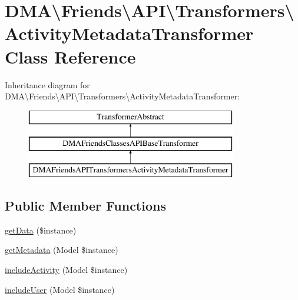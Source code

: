\hypertarget{classDMA_1_1Friends_1_1API_1_1Transformers_1_1ActivityMetadataTransformer}{}\section{D\+M\+A\textbackslash{}Friends\textbackslash{}A\+P\+I\textbackslash{}Transformers\textbackslash{}Activity\+Metadata\+Transformer Class Reference}
\label{classDMA_1_1Friends_1_1API_1_1Transformers_1_1ActivityMetadataTransformer}
Inheritance diagram for D\+M\+A\textbackslash{}Friends\textbackslash{}A\+P\+I\textbackslash{}Transformers\textbackslash{}Activity\+Metadata\+Transformer\+:\begin{figure}[H]
\begin{center}
\leavevmode
\includegraphics[height=3.000000cm]{dd/d8c/classDMA_1_1Friends_1_1API_1_1Transformers_1_1ActivityMetadataTransformer}
\end{center}
\end{figure}
\subsection*{Public Member Functions}
\begin{DoxyCompactItemize}
\item 
\hyperlink{classDMA_1_1Friends_1_1API_1_1Transformers_1_1ActivityMetadataTransformer_af1bd0fda73868743295a18510d0b507c}{get\+Data} (\$instance)
\item 
\hyperlink{classDMA_1_1Friends_1_1API_1_1Transformers_1_1ActivityMetadataTransformer_a699e499e8abef3facc46bb99e4ceacf3}{get\+Metadata} (Model \$instance)
\item 
\hyperlink{classDMA_1_1Friends_1_1API_1_1Transformers_1_1ActivityMetadataTransformer_a38bfe7aab17cf0599631c2c6c1b3fca7}{include\+Activity} (Model \$instance)
\item 
\hyperlink{classDMA_1_1Friends_1_1API_1_1Transformers_1_1ActivityMetadataTransformer_a863325b774ddcfde7616686a3e0527bb}{include\+User} (Model \$instance)
\end{DoxyCompactItemize}
